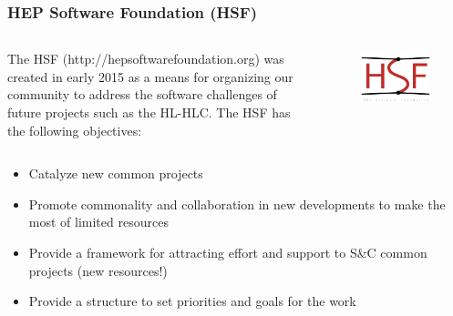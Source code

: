 \begin{frame}
\frametitle{HEP Software Foundation (HSF)}

\begin{columns}[T] %

\begin{column}{.75\textwidth}
The HSF (http://hepsoftwarefoundation.org) was created in early 2015 as a means for organizing our community to address the software challenges of future projects such as the HL-HLC. The HSF has the following objectives: 
\end{column}%

\hfill%

\begin{column}{.20\textwidth}
\begin{figure}[htbp]
\begin{center}
\includegraphics[width=1.0\textwidth]{images/hsf_logo_angled.png}
\end{center}
\end{figure}
\end{column}%

\end{columns}

\vskip 0.1in

\begin{itemize}
\item Catalyze new common projects
\item Promote commonality and collaboration in new developments to make the most of limited resources
\item Provide a framework for attracting effort and support to S\&C common projects (new resources!)
\item Provide a structure to set priorities and goals for the work
\end{itemize}



\end{frame}


